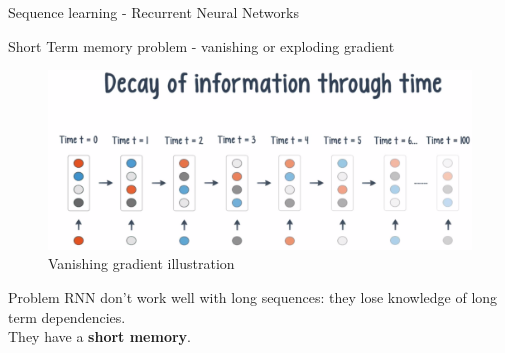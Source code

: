 \documentclass[9pt]{beamer}
\begin{document}
\begin{frame}{Sequence learning - Recurrent Neural Networks}
	\begin{center}
	\end{center}
\end{frame}

\begin{frame}{Short Term memory problem - vanishing or exploding gradient}
	\begin{figure}
		\includegraphics[width=\textwidth,trim={0 0 0 3cm},clip]{imgs/vanishing.png}
		\caption{Vanishing gradient illustration}
	\end{figure}
	\pause
	\begin{alertblock}{Problem}
		RNN don't work well with long sequences: they lose knowledge of long term dependencies.\\
		They have a \textbf{short memory}.
	\end{alertblock}
	
\end{frame}
\end{document}
